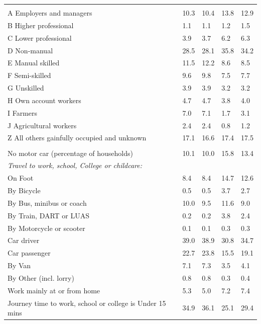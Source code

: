 \documentclass{article}
\begin{document}
\begin{table}[h]
\begin{tabular}{KTTTT}
\hline
    \\ 
    \hline
A Employers and managers & 10.3& 10.4& 13.8& 12.9\\
B Higher professional & 1.1& 1.1& 1.2& 1.5\\
C Lower professional & 3.9& 3.7& 6.2& 6.3\\
D Non-manual & 28.5& 28.1& 35.8& 34.2\\
E Manual skilled & 11.5& 12.2&  8.6&  8.5\\
F Semi-skilled & 9.6& 9.8& 7.5& 7.7\\
G Unskilled & 3.9& 3.9& 3.2& 3.2\\
H Own account workers & 4.7& 4.7& 3.8& 4.0\\
I Farmers & 7.0& 7.1& 1.7& 3.1\\
J Agricultural workers & 2.4& 2.4& 0.8& 1.2\\
Z All others gainfully occupied and unknown & 17.1& 16.6& 17.4& 17.5\\
\hline
{}\hline
    \\ 
    \hline
No motor car (percentage of households) & 10.1& 10.0& 15.8& 
13.4\\
    \hline 
\emph{Travel to work, school, College or childcare:} & & & \\
\quad On Foot &  8.4&  8.4& 14.7& 12.6\\ 
\quad By Bicycle & 0.5& 0.5& 3.7& 2.7\\ 
\quad By Bus, minibus or coach & 10.0&  9.5& 11.6&  9.0\\
\quad By Train, DART or LUAS & 0.2& 0.2& 3.8& 2.4\\
\quad By Motorcycle or scooter & 0.1& 0.1& 0.3& 0.3\\
\quad Car driver & 39.0 & 38.9& 30.8& 34.7\\
\quad Car passenger & 22.7& 23.8& 15.5& 19.1\\
\quad By Van & 7.1& 7.3& 3.5& 4.1\\
\quad By Other (incl. lorry) & 0.8& 0.8& 0.3& 0.4\\
    \hline
Work mainly at or from home & 5.3& 5.0& 7.2& 7.4\\
Journey time to work, school or college is Under 15 mins & 34.9& 36.1& 25.1& 29.4\\

\end{tabular}
\end{table}
\end{document}
